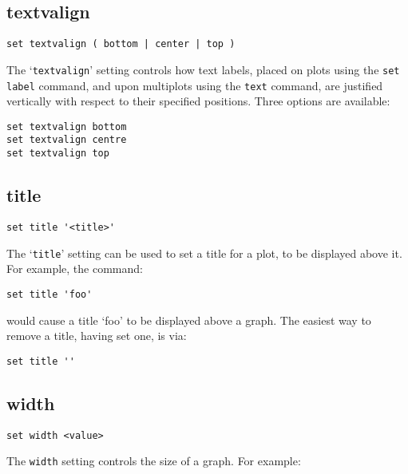 \documentclass[a4paper,onecolumn,11pt]{book}
\begin{document}
\subsection{textvalign}

\begin{verbatim}
set textvalign ( bottom | center | top )
\end{verbatim}

The `{\tt textvalign}' setting controls how text labels, placed on plots using the
{\tt set label} command, and upon multiplots using the {\tt text} command, are
justified vertically with respect to their specified positions. Three options
are available:

\begin{verbatim}
set textvalign bottom 
set textvalign centre
set textvalign top
\end{verbatim}

\subsection{title}

\begin{verbatim}
set title '<title>'
\end{verbatim}

The `{\tt title}' setting can be used to set a title for a plot, to be displayed
above it.  For example, the command:

\begin{verbatim}
set title 'foo'
\end{verbatim}

\noindent would cause a title `foo' to be displayed above a graph. The easiest
way to remove a title, having set one, is via:

\begin{verbatim}
set title ''
\end{verbatim}
   
\subsection{width}

\begin{verbatim}
set width <value>
\end{verbatim}

The {\tt width} setting controls the size of a graph.  For example:
\end{document}

